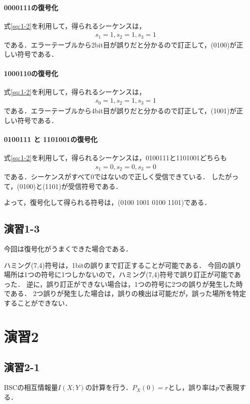 \documentclass[documentclass]{jsarticle}
\begin{document}
\paragraph*{0000111の復号化}
式\ref*{sq:1-2}を利用して，得られるシーケンスは，
\begin{align*}
  s_1 = 1, s_2 = 1, s_3 = 1
\end{align*}
である．エラーテーブルから2bit目が誤りだと分かるので訂正して，(0100)が正しい符号である．

\paragraph*{1000110の復号化}
式\ref*{sq:1-2}を利用して，得られるシーケンスは，
\begin{align*}
  s_0 = 1, s_2 = 1, s_3 = 1
\end{align*}
である．エラーテーブルから4bit目が誤りだと分かるので訂正して，(1001)が正しい符号である．

\paragraph*{0100111 と 1101001の復号化}
式\ref*{sq:1-2}を利用して，得られるシーケンスは，0100111と1101001どちらも
\begin{align*}
  s_1 = 0, s_2 = 0, s_3 = 0
\end{align*}
である．シーケンスがすべて0ではないので正しく受信できている．
したがって，(0100)と(1101)が受信符号である．

よって，復号化して得られる符号は，(0100 1001 0100 1101)である．

\subsection*{演習1-3}
今回は復号化がうまくできた場合である．

ハミング(7,4)符号は，1bitの誤りまで訂正することが可能である．
今回の誤り場所は1つの符号に1つしかないので，ハミング(7,4)符号で誤り訂正が可能であった．
逆に，誤り訂正ができない場合は，1つの符号に2つの誤りが発生した時である．
2つ誤りが発生した場合は，誤りの検出は可能だが，誤った場所を特定することができない．


\newpage

\section*{演習2}
\subsection*{演習2-1}
BSCの相互情報量$I(X;Y)$の計算を行う．$P_X(0)=r$とし，誤り率は$p$で表現する．
\end{document}
